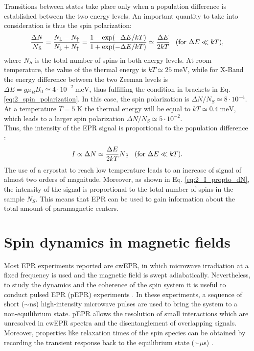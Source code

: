 \documentclass[a4paper]{book}
\newcommand{\sss}{\;\;\;} %
\newcommand{\tsub}{\textsubscript}
\begin{document}
	Transitions between states take place only when a population difference is established between the two energy levels. An important quantity to take into consideration is thus the spin polarization:
	\begin{equation}
		\frac{\Delta N}{N\tsub{S}} =
		\frac{N_\downarrow - N_\uparrow}{N_\downarrow + N_\uparrow} =
		\frac{1 - \exp(- \Delta E/kT)}{1 + \exp(- \Delta E/kT)} \simeq
		\frac{\Delta E}{2 kT} \sss \text{(for $\Delta E \ll kT$)},
		\label{eq:2_spin_polarization}
	\end{equation}
	where $N_S$ is the total number of spins in both energy levels. At room temperature, the value of the thermal energy is $kT \simeq 25 \; \text{meV}$, while for X-Band the energy difference between the two Zeeman levels is $\Delta E = g\mu_BB_0 \simeq 4 \cdot 10^{-2} \; \text{meV}$, thus fulfilling the condition in brackets in Eq. \eqref{eq:2_spin_polarization}. In this case, the spin polarization is $\Delta N/N_S \simeq 8\cdot10^{-4}$. At a temperature $T = 5 \; \text{K}$ the thermal energy will be equal to $kT \simeq 0.4 \; \text{meV}$, which leads to a larger spin polarization $\Delta N/N_S \simeq 5\cdot10^{-2}$.\\
	Thus, the intensity of the EPR signal is proportional to the population difference \cite{athertonPrinciplesElectronSpin1993}:
	\begin{equation}
		I \propto \Delta N \simeq
		\frac{\Delta E}{2kT}N\tsub{S} \sss \text{(for $\Delta E \ll kT$)}.
		\label{eq:2_I_propto_dN}
	\end{equation}
	The use of a cryostat to reach low temperature leads to an increase of signal of almost two orders of magnitude. Moreover, as shown in Eq. \eqref{eq:2_I_propto_dN}, the intensity of the signal is proportional to the total number of spins in the sample $N_S$. This means that EPR can be used to gain information about the total amount of paramagnetic centers.
	
	\section{Spin dynamics in magnetic fields}
	Most EPR experiments reported are cwEPR, in which microwave irradiation at a fixed frequency is used and the magnetic field is swept adiabatically. Nevertheless, to study the dynamics and the coherence of the spin system it is useful to conduct pulsed EPR (pEPR) experiments \cite{stollPulseEPR2017}. In these experiments, a sequence of short ($\sim \text{ns}$) high-intensity microwave pulses are used to bring the system to a non-equilibrium state. pEPR allows the resolution of small interactions which are unresolved in cwEPR spectra and the disentanglement of overlapping signals. Moreover, properties like relaxation times of the spin species can be obtained by recording the transient response back to the equilibrium state ($\sim\mu\text{s}$) \cite{stollPulseEPR2017}.\\
	
\end{document}
